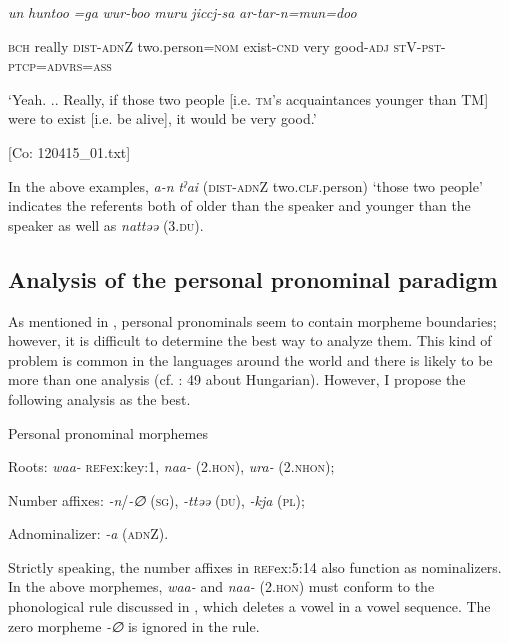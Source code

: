     \textit{un}  \textit{huntoo}  \textit{}  \textit{=ga}  \textit{wur-boo}  \textit{muru} \textit{jiccj-sa}  \textit{ar-tar-n=mun=doo}
                                                                                                  
    \textsc{bch}  really  \textsc{dist}-\textsc{adn}Z  two.person=\textsc{nom}  exist-\textsc{cnd}  very   good-\textsc{adj}  \textsc{st}V-\textsc{pst}-\textsc{ptcp}=\textsc{advrs}=\textsc{ass}

    ‘Yeah. .. Really, if those two people [i.e. \textsc{tm}’s acquaintances younger than TM] were to exist [i.e. be alive], it would be very good.’

    [Co: 120415\_01.txt]
\z
\z

In the above examples, \textit{a-n} \textit{tˀai} (\textsc{dist}-\textsc{adn}Z two.\textsc{clf}.person) ‘those two people’ indicates the referents both of older than the speaker and younger than the speaker as well as \textit{nattəə} (3.\textsc{du}).

\subsection{Analysis of the personal pronominal paradigm}

As mentioned in , personal pronominals seem to contain morpheme boundaries; however, it is difficult to determine the best way to analyze them. This kind of problem is common in the languages around the world and there is likely to be more than one analysis (cf. \citealt{Comrie1989}: 49 about Hungarian). However, I propose the following analysis as the best.

\ea \label{ex:5:14}  Personal pronominal morphemes

Roots:      \textit{waa-} \textsc{ref}{ex:key:1}, \textit{naa-} (2.\textsc{hon}), \textit{ura-} (2.\textsc{nhon});

Number affixes:  \textit{{}-n}/\textit{{}-∅} (\textsc{sg}), \textit{{}-ttəə} (\textsc{du}), \textit{{}-kja} (\textsc{pl});

Adnominalizer:  \textit{{}-a} (\textsc{adn}Z).
\z

Strictly speaking, the number affixes in \textsc{ref}{ex:5:14} also function as nominalizers. In the above morphemes, \textit{waa-}  and \textit{naa-} (2.\textsc{hon}) must conform to the phonological rule discussed in , which deletes a vowel in a vowel sequence. The zero morpheme \textit{{}-∅} is ignored in the rule.

